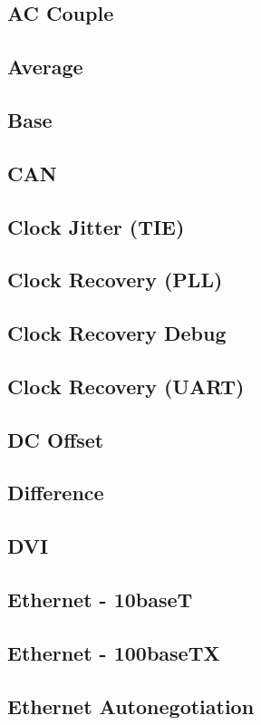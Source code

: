 \subsection{AC Couple}
\subsection{Average}
\subsection{Base}
\subsection{CAN}
\subsection{Clock Jitter (TIE)}
\subsection{Clock Recovery (PLL)}
\label{filter:cdrpll}

\subsection{Clock Recovery Debug}
\subsection{Clock Recovery (UART)}
\subsection{DC Offset}
\subsection{Difference}
\subsection{DVI}
\label{filter:dvi}

\subsection{Ethernet - 10baseT}
\subsection{Ethernet - 100baseTX}
\subsection{Ethernet Autonegotiation}
